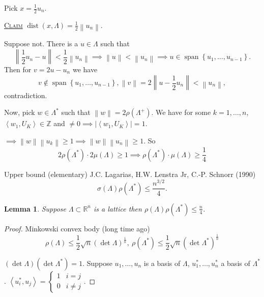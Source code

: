 \documentclass{report}
\newcommand{\R}{\mathbb{R}}
\newcommand{\Z}{\mathbb{Z}}
\def \dist {\operatorname{dist}}
\def \dist {\operatorname{dist}}
\newcommand{\inner}[2]{\left\langle #1, #2\right\rangle}
\newcommand{\norm}[1]{\left\| #1 \right\|}
\newcommand{\set}[1]{\left\{ #1 \right\}}
\newcommand{\fancyem}[1]{\underline{\textsc{#1}}}
\newtheorem{lemma}{Lemma}[section]
\theoremstyle{definition}
\theoremstyle{remark}
\numberwithin{equation}{section}
\begin{document}
Pick $x = \frac{1}{2}u_n$.

\fancyem{Claim} $\dist(x, \Lambda) = \frac{1}{2}\norm{u_n}$.

Suppose not. There is a $u \in \Lambda$ such that \[\norm{\frac{1}{2}u_n - u} < \frac{1}{2}\norm{u_n}\implies\norm{u}<\norm{u_n} \implies u \in \operatorname{span}\set{u_1, \ldots, u_{n-1}}.\]
Then for $v = 2u - u_n$ we have \[v \notin \operatorname{span}\set{u_1, \ldots, u_{n-1}}, \norm{v} = 2\norm{u - \frac{1}{2}u_n} < \norm{u_n},\] contradiction.

Now, pick $w \in \Lambda^*$ such that $\norm{w} = 2\rho(\Lambda^+)$. We have for some $k=1, \ldots, n$, $\inner{w_1}{U_K} \in \Z$ and $\neq 0 \implies |\inner{w_1}{U_K}| = 1$.

$\implies \norm{w}\norm{u_k} \geq 1 \implies \norm{w}\norm{u_n}\geq 1$. So \[2\rho(\Lambda^*) \cdot 2\mu(\Lambda) \geq 1 \implies \rho(\Lambda^*) \cdot \mu(\Lambda) \geq \frac{1}{4}\]

Upper bound (elementary) J.C. Lagarias, H.W. Lenstra Jr, C.-P. Schnorr (1990)
\[\sigma(\Lambda)\rho(\Lambda^*) \leq \frac{n^{3/2}}{4}.\]

\begin{lemma}
    Suppose $\Lambda \subset \R^n$ is a lattice then $\rho(\Lambda)\rho(\Lambda^*) \leq \frac{n}{4}$.
\end{lemma}
\begin{proof}
    Minkowski convex body (long time ago)\[\rho(\Lambda) \leq \frac{1}{2}\sqrt{n} (\det \Lambda)^\frac{1}{n},\ \rho(\Lambda^*) \leq \frac{1}{2}\sqrt{n} (\det \Lambda^*)^\frac{1}{n}\]

    $(\det\Lambda)(\det\Lambda^*) = 1$. Suppose $u_1, \ldots, u_n$ is a basis of $\Lambda$, $u^*_1, \ldots, u_n^*$ a basis of $\Lambda^*$. $\inner{u_i^*}{u_j} = \begin{cases}
        1 & i = j \\
        0 & i \neq j
    \end{cases}$.
\end{proof}
\end{document}
